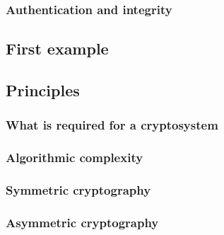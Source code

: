 \documentclass[compress]{beamer}
\theoremstyle{definition}
\theoremstyle{definition}
\theoremstyle{definition}
\theoremstyle{remark}
\theoremstyle{remark}
\theoremstyle{definition}
\theoremstyle{definition}
\theoremstyle{definition}
\theoremstyle{definition}
\theoremstyle{definition}
\theoremstyle{remark}
\theoremstyle{remark}
\theoremstyle{remark}
\theoremstyle{remark}
\begin{document}
				\subsubsection{Authentication and integrity}
				\begin{frame}
				\end{frame}
			\subsection{First example}
			\begin{frame}
			\end{frame}
			\subsection{Principles}
				\subsubsection{What is required for a cryptosystem}
				\begin{frame}
				\end{frame}
				\begin{frame}	
				\end{frame}
				
				\subsubsection{Algorithmic complexity}
				\begin{frame}
				\end{frame}
				\subsubsection{Symmetric cryptography}
				\begin{frame}
				\end{frame}
				\subsubsection{Asymmetric cryptography}
				\begin{frame}
				\end{frame}
				\begin{frame}
				\end{frame}
				\begin{frame}
				\end{frame}
				\begin{frame}
				\end{frame}
				\begin{frame}
				\end{frame}
\end{document}
